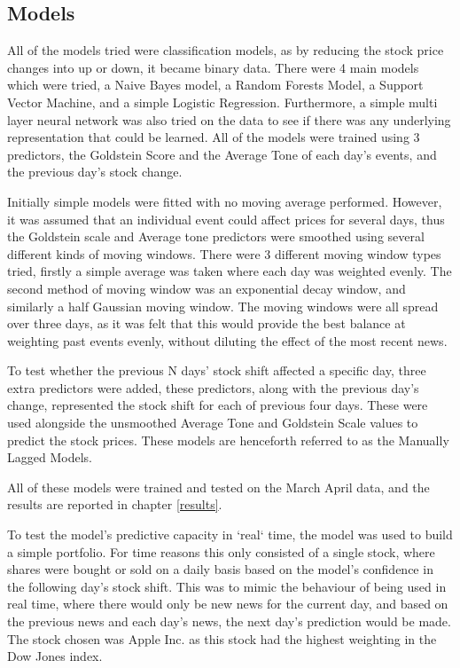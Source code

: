 \subsection{Models}
\label{models}
All of the models tried were classification models, as by reducing the stock price changes into up or down, it became binary data. There were 4 main models which were tried, a Naive Bayes model, a Random Forests Model, a Support Vector Machine, and a simple Logistic Regression. Furthermore, a simple multi layer neural network was also tried on the data to see if there was any underlying representation that could be learned. All of the models were trained using 3 predictors, the Goldstein Score and the Average Tone of each day's events, and the previous day's stock change. 

Initially simple models were fitted with no moving average performed. However, it was assumed that an individual event could affect prices for several days, thus the Goldstein scale and Average tone predictors were smoothed using several different kinds of moving windows. There were 3 different moving window types tried, firstly a simple average was taken where each day was weighted evenly. The second method of moving window was an exponential decay window, and similarly a half Gaussian moving window. The moving windows were all spread over three days, as it was felt that this would provide the best balance at weighting past events evenly, without diluting the effect of the most recent news.

To test whether the previous N days' stock shift affected a specific day, three extra predictors were added, these predictors, along with the previous day's change, represented the stock shift for each of previous four days. These were used alongside the unsmoothed Average Tone and Goldstein Scale values to predict the stock prices. These models are henceforth referred to as the Manually Lagged Models.

All of these models were trained and tested on the March April data, and the results are reported in chapter \ref{results}.

To test the model's predictive capacity in `real` time, the model was used to build a simple portfolio. For time reasons this only consisted of a single stock, where shares were bought or sold on a daily basis based on the model's confidence in the following day's stock shift. This was to mimic the behaviour of being used in real time, where there would only be new news for the current day, and based on the previous news and each day's news, the next day's prediction would be made. The stock chosen was Apple Inc. as this stock had the highest weighting in the Dow Jones index. 


